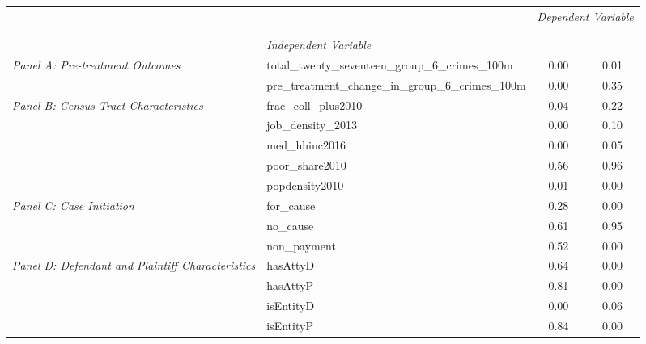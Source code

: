 \begin{tabular}{llcc}
\toprule
 &  & \multicolumn{2}{c}{\textit{Dependent Variable}} \\
\cline{3-4}
\\
 &  &  &  \\
 & \emph{Independent Variable} &  &  \\
\midrule
\multirow[c]{2}{3cm}{\textit{Panel A: Pre-treatment Outcomes}} & total_twenty_seventeen_group_6_crimes_100m & 0.00 & 0.01 \\
 & pre_treatment_change_in_group_6_crimes_100m & 0.00 & 0.35 \\
\cline{1-4}
\multirow[c]{5}{3cm}{\textit{Panel B: Census Tract Characteristics}} & frac_coll_plus2010 & 0.04 & 0.22 \\
 & job_density_2013 & 0.00 & 0.10 \\
 & med_hhinc2016 & 0.00 & 0.05 \\
 & poor_share2010 & 0.56 & 0.96 \\
 & popdensity2010 & 0.01 & 0.00 \\
\cline{1-4}
\multirow[c]{3}{3cm}{\textit{Panel C: Case Initiation}} & for_cause & 0.28 & 0.00 \\
 & no_cause & 0.61 & 0.95 \\
 & non_payment & 0.52 & 0.00 \\
\cline{1-4}
\multirow[c]{4}{3cm}{\textit{Panel D: Defendant and Plaintiff Characteristics}} & hasAttyD & 0.64 & 0.00 \\
 & hasAttyP & 0.81 & 0.00 \\
 & isEntityD & 0.00 & 0.06 \\
 & isEntityP & 0.84 & 0.00 \\
\cline{1-4}
\bottomrule
\end{tabular}
